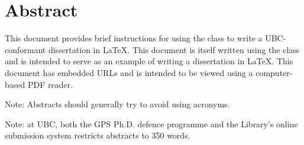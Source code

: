 
\chapter{Abstract}




This document provides brief instructions for using the 
class to write a \acs{UBC}-conformant dissertation in \LaTeX.  This
document is itself written using the  class and is
intended to serve as an example of writing a dissertation in \LaTeX.
This document has embedded \acp{URL} and is intended to be viewed
using a computer-based \ac{PDF} reader.

Note: Abstracts should generally try to avoid using acronyms.

Note: at \ac{UBC}, both the \ac{GPS} Ph.D. defence programme and the
Library's online submission system restricts abstracts to 350
words.

\vfill
\begin{center}
\begin{sf}
\end{sf}
\end{center}
